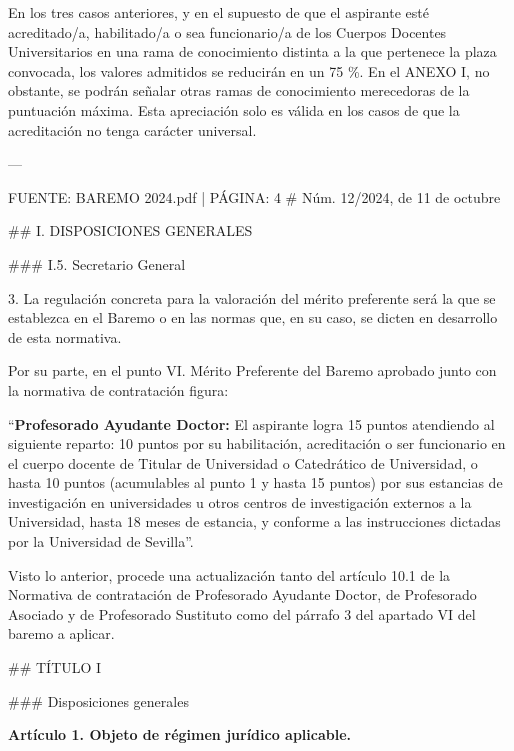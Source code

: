 \documentclass{article}
\begin{document}
\begin{itemize}
\begin{itemize}
\begin{scriptsize}
                  En los tres casos anteriores, y en el supuesto de que el aspirante esté acreditado/a, habilitado/a o sea funcionario/a de los Cuerpos Docentes Universitarios en una rama de conocimiento distinta a la que pertenece la plaza convocada, los valores admitidos se reducirán en un 75 \%. En el ANEXO I, no obstante, se podrán señalar otras ramas de conocimiento merecedoras de la puntuación máxima. Esta apreciación solo es válida en los casos de que la acreditación no tenga carácter universal.

                  ---

                  FUENTE: BAREMO 2024.pdf | PÁGINA: 4
                  \# Núm. 12/2024, de 11 de octubre

                  \#\# I. DISPOSICIONES GENERALES

                  \#\#\# I.5. Secretario General

                  3. La regulación concreta para la valoración del mérito preferente será la que se establezca en el Baremo o en las normas que, en su caso, se dicten en desarrollo de esta normativa.

                  Por su parte, en el punto VI. Mérito Preferente del Baremo aprobado junto con la normativa de contratación figura:

                  “\textbf{Profesorado Ayudante Doctor:} El aspirante logra 15 puntos atendiendo al siguiente reparto: 10 puntos por su habilitación, acreditación o ser funcionario en el cuerpo docente de Titular de Universidad o Catedrático de Universidad, o hasta 10 puntos (acumulables al punto 1 y hasta 15 puntos) por sus estancias de investigación en universidades u otros centros de investigación externos a la Universidad, hasta 18 meses de estancia, y conforme a las instrucciones dictadas por la Universidad de Sevilla”.

                  Visto lo anterior, procede una actualización tanto del artículo 10.1 de la Normativa de contratación de Profesorado Ayudante Doctor, de Profesorado Asociado y de Profesorado Sustituto como del párrafo 3 del apartado VI del baremo a aplicar.

                  \#\# TÍTULO I

                  \#\#\# Disposiciones generales

                  \textbf{Artículo 1. Objeto de régimen jurídico aplicable.}


\end{scriptsize}
\end{itemize}
\end{itemize}
\end{document}

